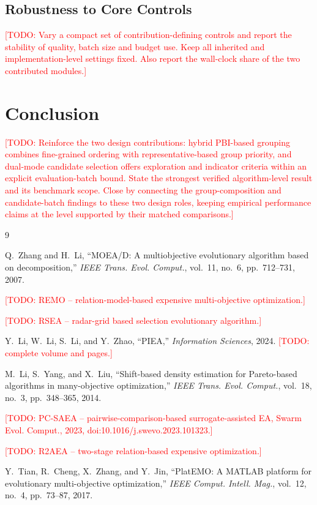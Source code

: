 \documentclass[final,5p,times,twocolumn]{elsarticle}
\newcommand{\TODO}[1]{\textcolor{red}{[TODO: #1]}}
\begin{document}
\subsection{Robustness to Core Controls}
\label{sec:exp:sensitivity}
\TODO{Vary a compact set of contribution-defining controls and report the
stability of quality, batch size and budget use. Keep all inherited and
implementation-level settings fixed. Also report the wall-clock share of the two
contributed modules.}

\section{Conclusion}
\label{sec:conclusion}
\TODO{Reinforce the two design contributions: hybrid PBI-based grouping combines
fine-grained ordering with representative-based group priority, and dual-mode
candidate selection offers exploration and indicator criteria within an
explicit evaluation-batch bound. State the strongest verified algorithm-level
result and its benchmark scope. Close by connecting the group-composition and
candidate-batch findings to these two design roles, keeping empirical performance
claims at the level supported by their matched comparisons.}

\begin{thebibliography}{9}

Q.~Zhang and H.~Li,
``MOEA/D: A multiobjective evolutionary algorithm based on decomposition,''
\emph{IEEE Trans. Evol. Comput.}, vol.~11, no.~6, pp.~712--731, 2007.

\TODO{REMO -- relation-model-based expensive multi-objective optimization.}

\TODO{RSEA -- radar-grid based selection evolutionary algorithm.}

Y.~Li, W.~Li, S.~Li, and Y.~Zhao,
``PIEA,'' \emph{Information Sciences}, 2024.
\TODO{complete volume and pages.}

M.~Li, S.~Yang, and X.~Liu,
``Shift-based density estimation for Pareto-based algorithms in
many-objective optimization,''
\emph{IEEE Trans. Evol. Comput.}, vol.~18, no.~3, pp.~348--365, 2014.

\TODO{PC-SAEA -- pairwise-comparison-based surrogate-assisted EA,
Swarm Evol. Comput., 2023, doi:10.1016/j.swevo.2023.101323.}

\TODO{R2AEA -- two-stage relation-based expensive optimization.}

Y.~Tian, R.~Cheng, X.~Zhang, and Y.~Jin,
``PlatEMO: A MATLAB platform for evolutionary multi-objective optimization,''
\emph{IEEE Comput. Intell. Mag.}, vol.~12, no.~4, pp.~73--87, 2017.

\end{thebibliography}
\end{document}
